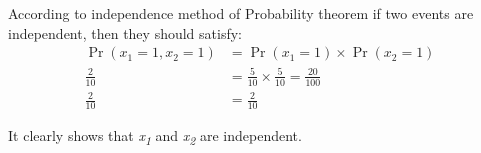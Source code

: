 \documentclass{article}
\DeclareMathOperator{\CondProb}{Pr}
\newcommand{\writex}[2]{{\it{#1\textsubscript#2}}}
\begin{document}
According to independence method of Probability theorem if two events are independent, then they should satisfy:
\begin{equation*}
	\begin{aligned}
	\CondProb{(x_1 = 1, x_2 = 1)} &= \CondProb{(x_1 = 1)}\times\CondProb{(x_2 = 1)} \\
	\frac{2}{10} &= \frac{5}{10}\times\frac{5}{10} = \frac{20}{100} \\
	\frac{2}{10} &= \frac{2}{10}
	\end{aligned}
\end{equation*}

It clearly shows that \writex{x}{1} and  \writex{x}{2} are independent. 
\end{document}
